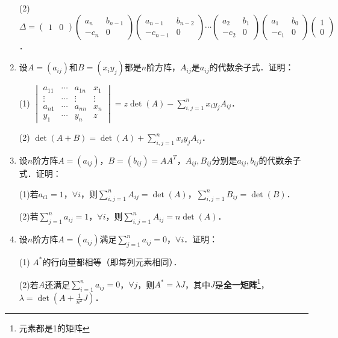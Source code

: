 \documentclass[a4paper,fontset=windows]{ctexbook}
\theoremstyle{definition}
\begin{document}
\begin{enumerate}
(2) $\Delta=\begin{pmatrix}1&0\end{pmatrix}\begin{pmatrix}a_n&b_{n-1} \\ -c_n&0\end{pmatrix}\begin{pmatrix}a_{n-1}&b_{n-2} \\ -c_{n-1}&0\end{pmatrix}\cdots\begin{pmatrix}a_2&b_1 \\ -c_2&0\end{pmatrix}\begin{pmatrix}a_1&b_0 \\ -c_1&0\end{pmatrix}\begin{pmatrix}1 \\ 0\end{pmatrix}$．

\item 设$A=(a_{ij})$和$B=(x_iy_j)$都是$n$阶方阵，$A_{ij}$是$a_{ij}$的代数余子式．证明：

(1) $\begin{vmatrix}a_{11}&\cdots&a_{1n}&x_1 \\ \vdots&\cdots&\vdots&\vdots \\ a_{n1}&\cdots&a_{nn}&x_n \\ y_1&\cdots&y_n&z\end{vmatrix}=z\det(A)-\sum\limits_{i,j=1}^nx_iy_jA_{ij}$．

(2) $\det(A+B)=\det(A)+\sum\limits_{i,j=1}^nx_iy_jA_{ij}$．

\item 设$n$阶方阵$A=(a_{ij})$，$B=(b_{ij})=AA^T$，$A_{ij},B_{ij}$分别是$a_{ij},b_{ij}$的代数余子式．证明：

(1)若$a_{i1}=1$，$\forall i$，则$\sum\limits_{i,j=1}^nA_{ij}=\det(A)$，$\sum\limits_{i,j=1}^nB_{ij}=\det(B)$．

(2)若$\sum\limits_{j=1}^na_{ij}=1$，$\forall i$，则$\sum\limits_{i,j=1}^nA_{ij}=n\det(A)$．

\item 设$n$阶方阵$A=(a_{ij})$满足$\sum\limits_{j=1}^na_{ij}=0$，$\forall i$．证明：

(1) $A^*$的行向量都相等（即每列元素相同）．

(2)若$A$还满足$\sum\limits_{i=1}^na_{ij}=0$，$\forall j$，则$A^*=\lambda J$，其中$J$是{\bf 全一矩阵}\footnote{元素都是1的矩阵}，$\lambda=\det(A+\frac{1}{n^2}J)$．


\end{enumerate}
\end{document}
